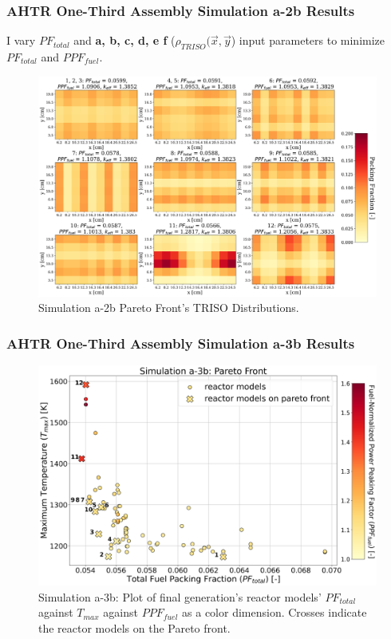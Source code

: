 \begin{frame}
    \frametitle{AHTR One-Third Assembly Simulation a-2b Results}
    I vary $PF_{total}$ and \textbf{a, b, c, d, e f} ($\rho_{TRISO}(\vec{x}, \vec{y}$)
    input parameters to minimize $PF_{total}$ and $PPF_{fuel}$. 
    \begin{figure}
        \includegraphics[width=0.8\linewidth]{../docs/figures/assem-obj-2-pfppf-pareto-distr.png} 
        \caption{Simulation a-2b Pareto Front's TRISO Distributions.}
    \end{figure}
\end{frame}

\begin{frame}
    \frametitle{AHTR One-Third Assembly Simulation a-3b Results}
    \begin{figure}
        \includegraphics[width=0.8\linewidth]{../docs/figures/assem-obj-3-all-2d.png} 
        \caption{Simulation a-3b: Plot of final generation's reactor models' 
        $PF_{total}$ against $T_{max}$ against $PPF_{fuel}$ as a color dimension. 
        Crosses indicate the reactor models on the Pareto front.}
    \end{figure}
\end{frame}

